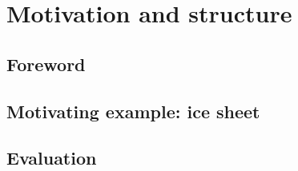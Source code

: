 \section{Motivation and structure}

\subsection{Foreword}


\subsection{Motivating example: ice sheet}\label{sect:icesheet}


\subsection{Evaluation}


